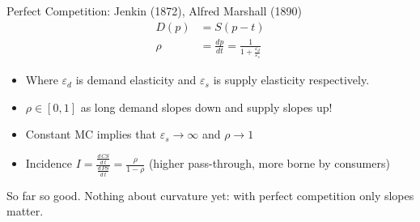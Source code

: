 \documentclass[aspectratio=169,10pt]{beamer}
\begin{document}
\begin{frame}{Perfect Competition: Jenkin (1872), Alfred Marshall (1890)}
\begin{align*}
D(p) &= S(p-t)\\
\rho&= \frac{d p}{d t} = \frac{1}{1 + \frac{\varepsilon_d}{\varepsilon_s}}
\end{align*}

\begin{itemize}
\item Where $\varepsilon_d$ is \alert{demand elasticity} and $\varepsilon_s$ is \alert{supply elasticity} respectively.\\
\item $\rho \in [0,1]$ as long demand slopes down and supply slopes up!
\item Constant MC implies that $\varepsilon_s \rightarrow \infty$ and $\rho \rightarrow 1$
\item Incidence $I = \frac{\frac{d\, CS}{d\, t}}{\frac{d\, PS}{d\, t}} = \frac{\rho}{1-\rho}$ (higher pass-through, more borne by consumers)
\end{itemize}
So far so good. Nothing about curvature yet: with perfect competition only slopes matter.
\end{frame}
\end{document}
